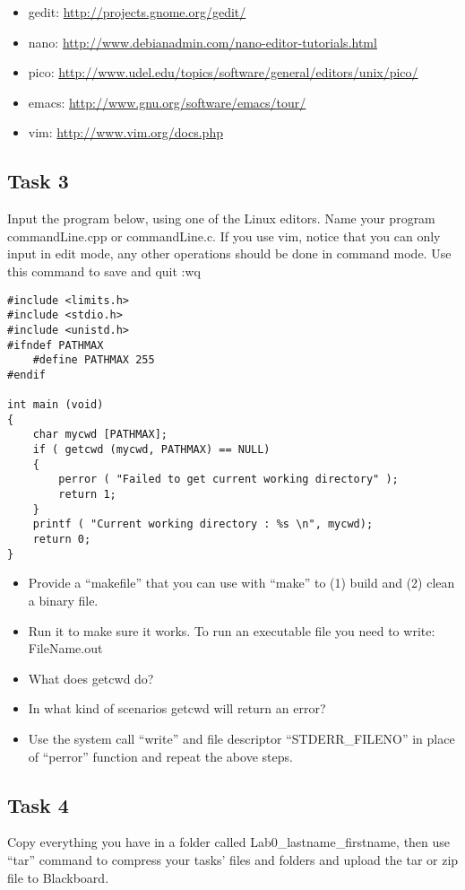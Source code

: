 \documentclass[16pt]{article}
\begin{document}
\begin{itemize}
\item	gedit: \url{http://projects.gnome.org/gedit/}

\item	nano: \url{http://www.debianadmin.com/nano-editor-tutorials.html}

\item	pico: \url{http://www.udel.edu/topics/software/general/editors/unix/pico/}

\item	emacs: \url{http://www.gnu.org/software/emacs/tour/}

\item	vim: \url{http://www.vim.org/docs.php}

\end{itemize}

\subsection*{Task 3}
Input the program below, using one of the Linux editors. Name your program commandLine.cpp or commandLine.c. If you use vim, notice that you can only input in edit mode, any other operations should be done in command mode. Use this command to save and quit
:wq
\begin{lstlisting}
#include <limits.h> 
#include <stdio.h> 
#include <unistd.h> 
#ifndef PATHMAX 
	#define PATHMAX 255 
#endif

int main (void) 
{ 
	char mycwd [PATHMAX]; 
    if ( getcwd (mycwd, PATHMAX) == NULL) 
    { 
    	perror ( "Failed to get current working directory" ); 
        return 1; 
    } 
    printf ( "Current working directory : %s \n", mycwd); 
    return 0; 
}
\end{lstlisting} 


\begin{itemize}
\item Provide a ``makefile'' that you can use with ``make'' to (1) build and (2) clean a binary file. 

\item	Run it to make sure it works. To run an executable file you need to write: FileName.out

\item	What does getcwd do? 

\item In what kind of scenarios getcwd will return an error? 

\item Use the system call ``write'' and file descriptor ``STDERR\_FILENO'' in place of ``perror'' function and repeat the above steps.

\end{itemize}

\subsection*{Task 4}

Copy everything you have in a folder called Lab0\_lastname\_firstname, then use ``tar'' command to compress your tasks' files and folders and upload the tar or zip file to Blackboard.
\end{document}
